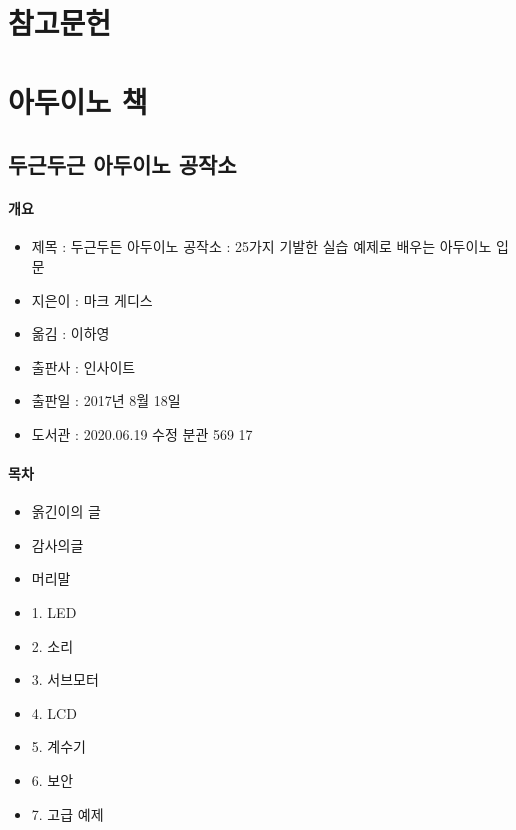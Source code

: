 \documentclass[12pt, a4paper, oneside]{book}
\let\stdsection\section
\renewcommand\section{\newpage\stdsection}
\begin{document}
	\section{ 참고문헌}

%
	\section{아두이노 책 }


	\subsection{두근두근 아두이노 공작소}

\paragraph{개요}

\begin{itemize}[					
		topsep=0.0em,			
		parsep=0.0em,			
		itemsep=0em,			
		leftmargin=	3	em,
		labelwidth=	1	em,			
		labelsep=		1	 em			
]					
	\item	제목 	: 두근두든 아두이노 공작소 : 25가지 기발한 실습 예제로 배우는 아두이노 입문
	\item	지은이 	: 마크 게디스
	\item	옮김 	: 이하영
	\item	출판사 	: 인사이트
	\item	출판일 	: 2017년 8월 18일
	\item	도서관 	: 2020.06.19 수정 분관 569 17

\end{itemize}				

\paragraph{목차}
	
\begin{itemize}[					
		topsep=0.0em,			
		parsep=0.0em,			
		itemsep=0em,			
		leftmargin=	3	em,
		labelwidth=	1	em,			
		labelsep=		1	 em			
]					
	\item	옭긴이의 글
	\item	감사의글
	\item	머리말
	\item	1. LED
	\item	2. 소리
	\item	3. 서브모터
	\item	4. LCD
	\item	5. 계수기
	\item	6. 보안
	\item	7. 고급 예제

\end{itemize}					
\end{document}
